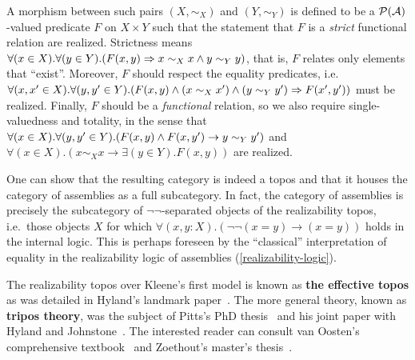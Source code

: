 A morphism between such pairs \((X,\sim_X)\) and \((Y,\sim_Y)\) is defined
to be a \(\mathcal P(\mathcal A)\)\nobreakdash-valued predicate \(F\) on \(X \times Y\)
such that the statement that \(F\) is a \emph{strict} functional relation are
realized.  Strictness means
\(\forall(x\in X).\forall(y\in Y).\pa*{F(x,y) \Rightarrow x \sim_X x \land y
  \sim_Y y}\), that is, \(F\) relates only elements that ``exist''.
%
Moreover, \(F\) should respect the equality predicates, i.e.\
\(\forall(x,x'\in X).\forall(y,y' \in Y).\pa*{F(x,y)\land(x\sim_X
  x')\land(y\sim_Y y') \Rightarrow F(x',y')}\) must be realized.
%
Finally, \(F\) should be a \emph{functional} relation, so we also require
single-valuedness and totality, in the sense that
\(\forall(x\in X).\forall(y,y' \in Y).\pa*{F(x,y) \land F(x,y') \to y \sim_Y
  y'}\) and \(\forall(x \in X).(x \sim_X x \to \exists(y \in Y).F(x,y))\) are
realized.

One can show that the resulting category is indeed a topos and that it houses
the category of assemblies as a full subcategory. In fact, the category of
assemblies is precisely the subcategory of \(\lnot\lnot\)-separated objects of
the realizability topos, i.e.\ those objects \(X\) for which
\(\forall(x,y:X).(\lnot\lnot(x=y) \to (x=y))\) holds in the internal logic.
%
This is perhaps foreseen by the ``classical'' interpretation of equality in the
realizability logic of assemblies (\cref{realizability-logic}).

The realizability topos over Kleene's first model is known as \textbf{the
  effective topos} as was detailed in Hyland's landmark paper~\cite{Hyland1982}.
%
The more general theory, known as \textbf{tripos theory}, was the subject of
Pitts's PhD thesis~\cite{Pitts1981} and his joint paper with Hyland and
Johnstone~\cite{HJP1980}.
%
The interested reader can consult van Oosten's comprehensive
textbook~\cite{vanOosten2008} and Zoethout's master's
thesis~\cite{Zoethout2018}.

